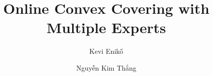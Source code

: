 \documentclass[11pt,a4paper]{article}
\begin{document}
\title{Online Convex Covering with Multiple Experts}

\author{Kevi Enik\H{o}}
\author{Nguyễn Kim Thắng}

\maketitle








\clearpage




\clearpage

\appendix




\end{document}
